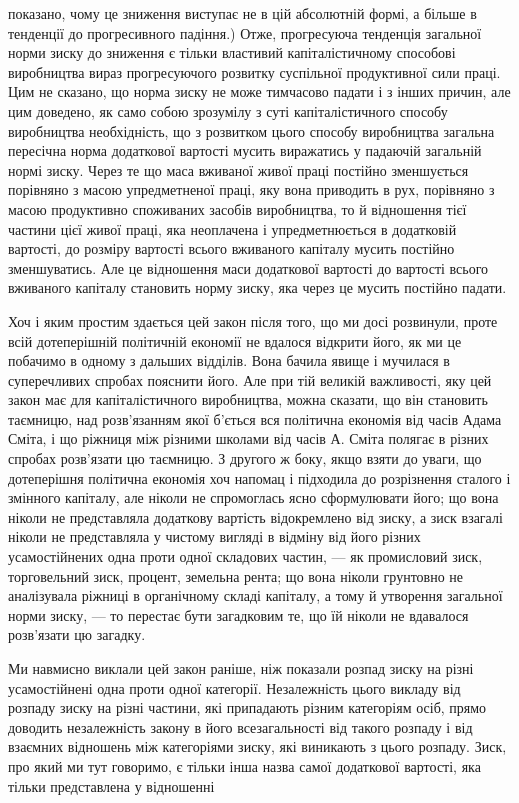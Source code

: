 показано, чому це зниження виступає не в цій абсолютній формі,
а більше в тенденції до прогресивного падіння.) Отже, прогресуюча
тенденція загальної норми зиску до зниження є тільки
властивий капіталістичному способові виробництва вираз
прогресуючого розвитку суспільної продуктивної сили праці.
Цим не сказано, що норма зиску не може тимчасово падати і
з інших причин, але цим доведено, як само собою зрозумілу
з суті капіталістичного способу виробництва необхідність, що
з розвитком цього способу виробництва загальна пересічна норма
додаткової вартості мусить виражатись у падаючій загальній
нормі зиску. Через те що маса вживаної живої праці постійно
зменшується порівняно з масою упредметненої праці, яку вона
приводить в рух, порівняно з масою продуктивно споживаних
засобів виробництва, то й відношення тієї частини цієї живої
праці, яка неоплачена і упредметнюється в додатковій вартості,
до розміру вартості всього вживаного капіталу мусить постійно
зменшуватись. Але це відношення маси додаткової вартості до
вартості всього вживаного капіталу становить норму зиску, яка
через це мусить постійно падати.

Хоч і яким простим здається цей закон після того, що ми досі
розвинули, проте всій дотеперішній політичній економії не вдалося
відкрити його, як ми це побачимо в одному з дальших відділів.
Вона бачила явище і мучилася в суперечливих спробах
пояснити його. Але при тій великій важливості, яку цей закон
має для капіталістичного виробництва, можна сказати, що він
становить таємницю, над розв’язанням якої б’ється вся політична
економія від часів Адама Сміта, і що ріжниця між різними школами
від часів А. Сміта полягає в різних спробах розв’язати цю
таємницю. З другого ж боку, якщо взяти до уваги, що дотеперішня
політична економія хоч напомац і підходила до розрізнення
сталого і змінного капіталу, але ніколи не спромоглась
ясно сформулювати його; що вона ніколи не представляла додаткову
вартість відокремлено від зиску, а зиск взагалі ніколи
не представляла у чистому вигляді в відміну від його різних
усамостійнених одна проти одної складових частин, — як промисловий
зиск, торговельний зиск, процент, земельна рента; що
вона ніколи грунтовно не аналізувала ріжниці в органічному
складі капіталу, а тому й утворення загальної норми зиску, —
то перестає бути загадковим те, що їй ніколи не вдавалося розв’язати
цю загадку.

Ми навмисно виклали цей закон раніше, ніж показали розпад
зиску на різні усамостійнені одна проти одної категорії. Незалежність
цього викладу від розпаду зиску на різні частини,
які припадають різним категоріям осіб, прямо доводить незалежність
закону в його всезагальності від такого розпаду і від
взаємних відношень між категоріями зиску, які виникають з цього
розпаду. Зиск, про який ми тут говоримо, є тільки інша назва
самої додаткової вартості, яка тільки представлена у відношенні
